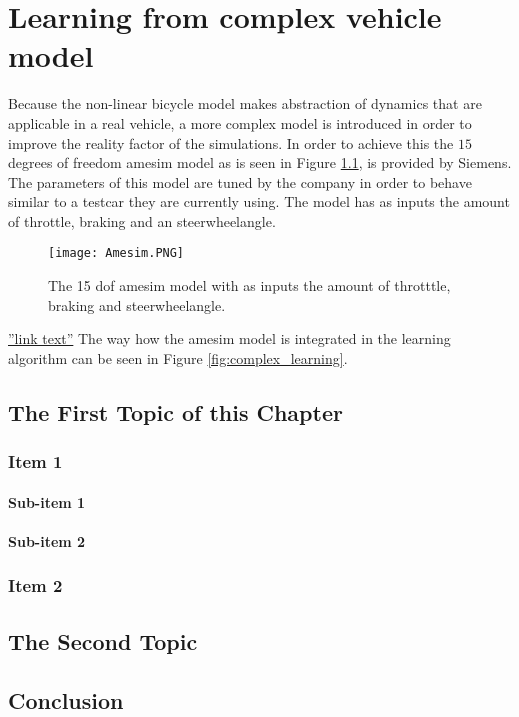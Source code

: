 \chapter{Learning from complex vehicle model}
\label{cha:Tracking_MPC}


Because the non-linear bicycle model makes abstraction of dynamics that are applicable in a real vehicle, a more complex model is introduced in order to improve the reality factor of the simulations. In order to achieve this the $15$ degrees of freedom amesim model as is seen in Figure \ref{fig:Amesim}, is provided by Siemens. The parameters of this model are tuned by the company in order to behave similar to a testcar they are currently using. The model has as inputs the amount of throttle, braking and an steerwheelangle.  

\begin{figure}[h!]
	\centering
	\texttt{[image: Amesim.PNG]}
	\caption{The 15 dof amesim model with as inputs the amount of throtttle, braking and steerwheelangle.}	
	\label{fig:Amesim}
	
\end{figure}

\hyperref[fig:Amesim]{''link text''}
The way how the amesim model is integrated in the learning algorithm can be seen in Figure \ref{fig:complex_learning}. 


\section{The First Topic of this Chapter}
\subsection{Item 1}
\subsubsection{Sub-item 1}


\subsubsection{Sub-item 2}


\subsection{Item 2}


\section{The Second Topic}


\section{Conclusion}

